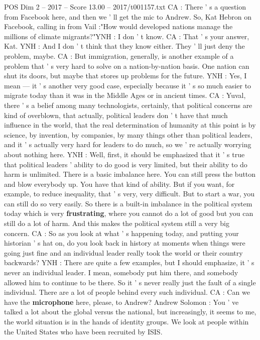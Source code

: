 \begin{textsample}{POS Dim 2 – 2017 – Score 13.00 – 2017/t001157.txt}
CA : There ' s a question from Facebook here, and then we ' ll get the mic to Andrew.
So, Kat Hebron on Facebook, calling in from Vail :"How would developed nations manage the millions of climate migrants?"YNH : I don ' t know.
CA : That ' s your answer, Kat.
YNH : And I don ' t think that they know either.
They ' ll just deny the problem, maybe.
CA : But immigration, generally, is another example of a problem that ' s very hard to solve on a nation-by-nation basis.
One nation can shut its doors, but maybe that stores up problems for the future.
YNH : Yes, I mean — it ' s another very good case, especially because it ' s so much easier to migrate today than it was in the Middle Ages or in ancient times.
CA : Yuval, there ' s a belief among many technologists, certainly, that political concerns are kind of overblown, that actually, political leaders don ' t have that much influence in the world, that the real determination of humanity at this point is by science, by invention, by companies, by many things other than political leaders, and it ' s actually very hard for leaders to do much, so we ' re actually worrying about nothing here.
YNH : Well, first, it should be emphasized that it ' s true that political leaders ' ability to do good is very limited, but their ability to do harm is unlimited.
There is a basic imbalance here.
You can still press the button and blow everybody up.
You have that kind of ability.
But if you want, for example, to reduce inequality, that ' s very, very difficult.
But to start a war, you can still do so very easily.
So there is a built-in imbalance in the political system today which is very \textbf{frustrating}, where you cannot do a lot of good but you can still do a lot of harm.
And this makes the political system still a very big concern.
CA : So as you look at what ' s happening today, and putting your historian ' s hat on, do you look back in history at moments when things were going just fine and an individual leader really took the world or their country backwards?
YNH : There are quite a few examples, but I should emphasize, it ' s never an individual leader.
I mean, somebody put him there, and somebody allowed him to continue to be there.
So it ' s never really just the fault of a single individual.
There are a lot of people behind every such individual.
CA : Can we have the \textbf{microphone} here, please, to Andrew?
Andrew Solomon : You ' ve talked a lot about the global versus the national, but increasingly, it seems to me, the world situation is in the hands of identity groups.
We look at people within the United States who have been recruited by ISIS.

\end{textsample}
